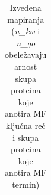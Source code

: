 \begin{table}[htpb]
\begin{tabular}{|p{6cm}|p{0.7cm}|p{0.5cm}|p{0.7cm}|p{8cm}|}

\end{tabular}
  \caption{Izvedena mapiranja\\ \small 
  (\textit{n\_kw} i \textit{n\_go} obeležavaju arnost skupa proteina koje anotira MF ključna reč i skupa proteina koje anotira MF termin) }
  \label{tab:izvedeno_mapiranje}
\end{table}


